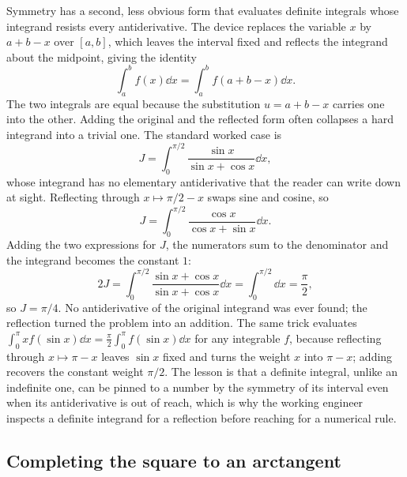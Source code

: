 Symmetry has a second, less obvious form that evaluates definite integrals
whose integrand resists every antiderivative. The device replaces the
variable $x$ by $a + b - x$ over $[a, b]$, which leaves the interval fixed
and reflects the integrand about the midpoint, giving the identity
\[
\int_{a}^{b} f(x)\dd x = \int_{a}^{b} f(a + b - x)\dd x.
\]
The two integrals are equal because the substitution $u = a + b - x$
carries one into the other. Adding the original and the reflected form
often collapses a hard integrand into a trivial one. The standard worked
case is
\[
J = \int_{0}^{\pi/2}\frac{\sin x}{\sin x + \cos x}\dd x,
\]
whose integrand has no elementary antiderivative that the reader can
write down at sight. Reflecting through $x \mapsto \pi/2 - x$ swaps sine
and cosine, so
\[
J = \int_{0}^{\pi/2}\frac{\cos x}{\cos x + \sin x}\dd x.
\]
Adding the two expressions for $J$, the numerators sum to the denominator
and the integrand becomes the constant $1$:
\[
2J = \int_{0}^{\pi/2}\frac{\sin x + \cos x}{\sin x + \cos x}\dd x =
\int_{0}^{\pi/2}\dd x = \frac{\pi}{2},
\]
so $J = \pi/4$. No antiderivative of the original integrand was ever
found; the reflection turned the problem into an addition. The same trick
evaluates $\int_{0}^{\pi} x f(\sin x)\dd x = \tfrac{\pi}{2}\int_{0}^{\pi}
f(\sin x)\dd x$ for any integrable $f$, because reflecting through
$x \mapsto \pi - x$ leaves $\sin x$ fixed and turns the weight $x$ into
$\pi - x$; adding recovers the constant weight $\pi/2$. The lesson is that
a definite integral, unlike an indefinite one, can be pinned to a number
by the symmetry of its interval even when its antiderivative is out of
reach, which is why the working engineer inspects a definite integrand for
a reflection before reaching for a numerical rule.

\subsection{Completing the square to an arctangent}

